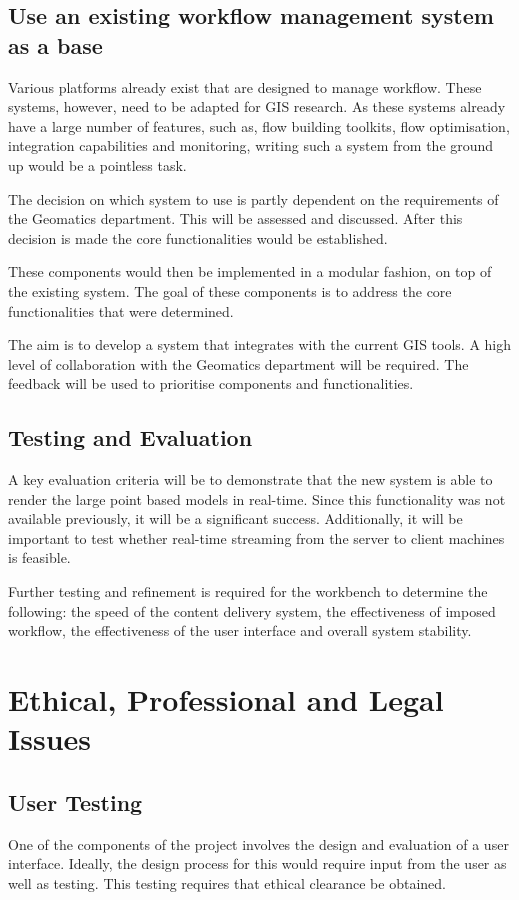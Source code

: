 \documentclass[12pt,a4paper]{article}
\begin{document}
\subsection{Use an existing workflow management system as a base}
Various platforms already exist that are designed to manage workflow. These
systems, however, need to be adapted for GIS research. As these systems already
have a large number of features, such as, flow building toolkits, flow optimisation,
integration capabilities and monitoring, writing such a system
from the ground up would be a pointless task.

The decision on which system to use is partly dependent on the requirements
of the Geomatics department. This will be assessed and discussed. After
this decision is made the core functionalities would be established.

These components would then be implemented in a modular fashion, on top of
the existing system. The goal of these components is to address the core
functionalities that were determined.

The aim is to develop a system that integrates with  the current GIS
tools. A high level of collaboration with the Geomatics department will
be required. The feedback will be used to prioritise components and
functionalities.


\subsection{Testing and Evaluation}
A key evaluation criteria will be to demonstrate that the new
system is able to render the large point based models in real-time. Since this
functionality was not available previously, it will be a significant success.
Additionally, it will be important to test whether real-time streaming from the
server to client machines is feasible.

Further testing and refinement is required for the workbench
to determine the  following: the speed of the content
delivery system, the effectiveness of imposed workflow, the
effectiveness of the user interface and overall system stability.

\section{Ethical, Professional and Legal Issues}
\subsection{User Testing}
One of the components of the project involves the design and evaluation
of a user interface. Ideally, the design process for this would require
input from the user as well as testing. This testing requires that ethical clearance
be obtained.
\end{document}
